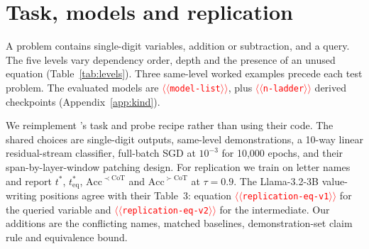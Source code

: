\documentclass[11pt]{article}
\providecommand{\NUM}[1]{\textcolor{red}{$\langle\langle$\texttt{#1}$\rangle\rangle$}}
\begin{document}


\appendix

\section{Task, models and replication}
\label{app:task}
A problem contains single-digit variables, addition or subtraction, and a query. The five
levels vary dependency order, depth and the presence of an unused equation
(Table~\ref{tab:levels}). Three same-level worked examples precede each test problem.
The evaluated models are \NUM{model-list}, plus \NUM{n-ladder} derived checkpoints
(Appendix~\ref{app:kind}).

\begin{table}[t]
\centering\small\setlength{\tabcolsep}{4pt}
\caption{The five levels of \citet{kudo2026faithful}: additions or subtractions needed
(\emph{Steps}), variables unresolved when first read (\emph{Held}), and unused equations
(\emph{Distr.}). At level~1 the intermediate value is stated rather than computed.}
\label{tab:levels}
\end{table}

We reimplement \citet{kudo2026faithful}'s task and probe recipe rather than using their code.
The shared choices are single-digit outputs, same-level demonstrations, a 10-way linear
residual-stream classifier, full-batch SGD at $10^{-3}$ for 10,000 epochs, and their
span-by-layer-window patching design. For replication we train on letter names and report
$t^{*}$, $t^{*}_{\mathrm{eq}}$, $\mathrm{Acc}^{\prec\mathrm{CoT}}$ and
$\mathrm{Acc}^{\succ\mathrm{CoT}}$ at $\tau=0.9$.
The Llama-3.2-3B value-writing positions agree with their Table~3: equation
\NUM{replication-eq-v1} for the queried variable and \NUM{replication-eq-v2} for the intermediate.
Our additions are the conflicting names, matched baselines, demonstration-set claim rule and
equivalence bound.
\end{document}

